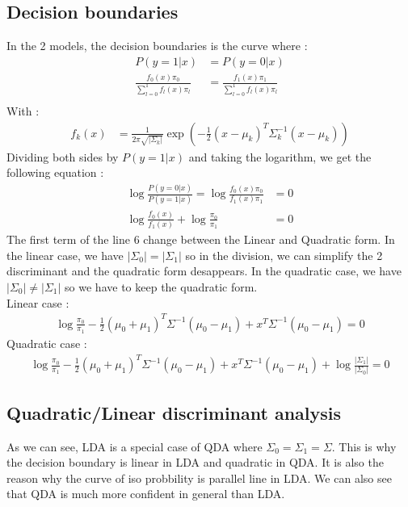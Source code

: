 \documentclass[12pt]{article}
\begin{document}
\subsection{Decision boundaries}
In the 2 models, the decision boundaries is the curve where :
\begin{align}	
P(y=1|x) &= P(y=0|x)\\
\frac{f_0(x)\pi_0}{\sum^1_{l=0}f_l(x)\pi_l}&=\frac{f_1(x)\pi_1}{\sum^1_{l=0}f_l(x)\pi_l}\\
\end{align}
With : 
\begin{align}
	f_k(x) &= \frac{1}{2\pi\sqrt{|\Sigma_k|}}\exp\left(-\frac{1}{2}(x-\mu_k)^T\Sigma_k^{-1}(x-\mu_k)\right)
\end{align}
Dividing both sides by $P(y=1|x)$ and taking the logarithm, we get the following equation :
\begin{align}
	\log\frac{P(y=0|x)}{P(y=1|x)} = \log\frac{f_0(x)\pi_0}{f_1(x)\pi_1 }&=0\\
	\log\frac{f_0(x)}{f_1(x)} + \log\frac{\pi_0}{\pi_1}&= 0
\end{align}
The first term of the line 6 change between the Linear and Quadratic form. In the linear case, we have $|\Sigma_0|=|\Sigma_1|$ so in the division, we can simplify the 2 discriminant
and the quadratic form desappears. In the quadratic case, we have $|\Sigma_0|\neq|\Sigma_1|$ so we have to keep the quadratic form.\\
Linear case : 
\begin{align}
	\log\frac{\pi_0}{\pi_1} - \frac{1}{2}(\mu_0+\mu_1)^T\Sigma^{-1}(\mu_0-\mu_1) + x^T\Sigma^{-1}(\mu_0-\mu_1) = 0
\end{align}
Quadratic case : 
\begin{align}
	\log\frac{\pi_0}{\pi_1} - \frac{1}{2}(\mu_0+\mu_1)^T\Sigma^{-1}(\mu_0-\mu_1) + x^T\Sigma^{-1}(\mu_0-\mu_1) + \log\frac{|\Sigma_1|}{|\Sigma_0|} = 0
\end{align}
\subsection[]{Quadratic/Linear discriminant analysis}
As we can see, LDA is a special case of QDA where $\Sigma_0=\Sigma_1=\Sigma$. This is why the decision boundary is linear in LDA and quadratic in QDA.
It is also the reason why the curve of iso probbility is parallel line in LDA. We can also see that QDA is much more confident in general than LDA.
\end{document}
